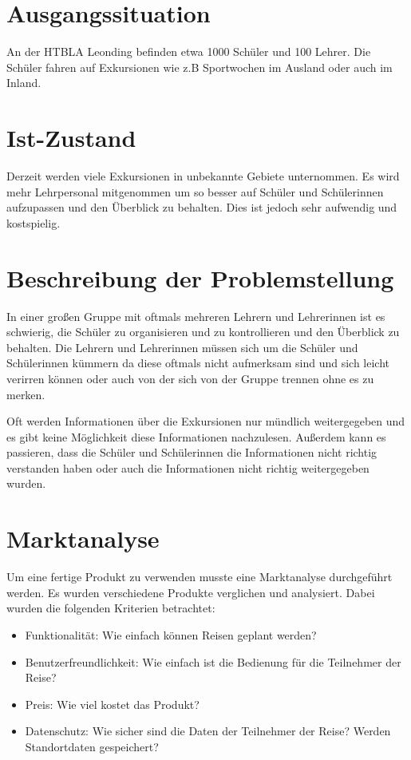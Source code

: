 \section{Ausgangssituation}
An der HTBLA Leonding befinden etwa 1000 Schüler und 100 Lehrer.
Die Schüler fahren auf Exkursionen wie z.B Sportwochen im Ausland oder auch im Inland.

\section{Ist-Zustand}
Derzeit werden viele Exkursionen in unbekannte Gebiete unternommen. Es wird mehr Lehrpersonal mitgenommen um so besser auf Schüler und Schülerinnen aufzupassen und den Überblick zu behalten. Dies ist jedoch sehr aufwendig und kostspielig. 

\section{Beschreibung der Problemstellung}
In einer großen Gruppe mit oftmals mehreren Lehrern und Lehrerinnen ist es schwierig, die Schüler zu organisieren und zu kontrollieren und  den Überblick zu behalten. Die Lehrern und Lehrerinnen müssen sich um die Schüler und Schülerinnen kümmern da diese oftmals nicht aufmerksam sind und sich leicht verirren können oder auch von der sich von der Gruppe trennen ohne es zu merken.

Oft werden Informationen über die Exkursionen nur mündlich weitergegeben und es gibt keine Möglichkeit diese Informationen nachzulesen. Außerdem kann es passieren, dass die Schüler und Schülerinnen die Informationen nicht richtig verstanden haben oder auch die Informationen nicht richtig weitergegeben wurden.

\newpage

\section{Marktanalyse}
Um eine fertige Produkt zu verwenden musste eine Marktanalyse durchgeführt werden. Es wurden verschiedene Produkte verglichen und analysiert. Dabei wurden die folgenden Kriterien betrachtet:
\begin{itemize}
    \item Funktionalität: Wie einfach können Reisen geplant werden? 
    \item Benutzerfreundlichkeit: Wie einfach ist die Bedienung für die Teilnehmer der Reise?
    \item Preis: Wie viel kostet das Produkt?
    \item Datenschutz: Wie sicher sind die Daten der Teilnehmer der Reise? Werden Standortdaten gespeichert?
\end{itemize}

